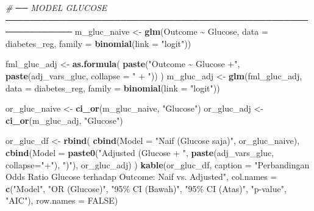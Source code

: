 \documentclass[
  11pt,
]{article}
\newenvironment{Shaded}{\begin{snugshade}}{\end{snugshade}}
\newcommand{\AttributeTok}[1]{\textcolor[rgb]{0.13,0.29,0.53}{#1}}
\newcommand{\CommentTok}[1]{\textcolor[rgb]{0.56,0.35,0.01}{\textit{#1}}}
\newcommand{\ConstantTok}[1]{\textcolor[rgb]{0.56,0.35,0.01}{#1}}
\newcommand{\FunctionTok}[1]{\textcolor[rgb]{0.13,0.29,0.53}{\textbf{#1}}}
\newcommand{\NormalTok}[1]{#1}
\newcommand{\OtherTok}[1]{\textcolor[rgb]{0.56,0.35,0.01}{#1}}
\newcommand{\SpecialCharTok}[1]{\textcolor[rgb]{0.81,0.36,0.00}{\textbf{#1}}}
\newcommand{\StringTok}[1]{\textcolor[rgb]{0.31,0.60,0.02}{#1}}
\begin{document}
\begin{Shaded}
\begin{Highlighting}[]
\CommentTok{\# ── MODEL GLUCOSE ─────────────────────────────────────────────────────────────}
\NormalTok{m\_gluc\_naive }\OtherTok{\textless{}{-}} \FunctionTok{glm}\NormalTok{(Outcome }\SpecialCharTok{\textasciitilde{}}\NormalTok{ Glucose,}
                     \AttributeTok{data   =}\NormalTok{ diabetes\_reg,}
                     \AttributeTok{family =} \FunctionTok{binomial}\NormalTok{(}\AttributeTok{link =} \StringTok{"logit"}\NormalTok{))}

\NormalTok{fml\_gluc\_adj }\OtherTok{\textless{}{-}} \FunctionTok{as.formula}\NormalTok{(}
  \FunctionTok{paste}\NormalTok{(}\StringTok{"Outcome \textasciitilde{} Glucose +"}\NormalTok{, }\FunctionTok{paste}\NormalTok{(adj\_vars\_gluc, }\AttributeTok{collapse =} \StringTok{" + "}\NormalTok{))}
\NormalTok{)}
\NormalTok{m\_gluc\_adj }\OtherTok{\textless{}{-}} \FunctionTok{glm}\NormalTok{(fml\_gluc\_adj,}
                   \AttributeTok{data   =}\NormalTok{ diabetes\_reg,}
                   \AttributeTok{family =} \FunctionTok{binomial}\NormalTok{(}\AttributeTok{link =} \StringTok{"logit"}\NormalTok{))}

\NormalTok{or\_gluc\_naive }\OtherTok{\textless{}{-}} \FunctionTok{ci\_or}\NormalTok{(m\_gluc\_naive, }\StringTok{"Glucose"}\NormalTok{)}
\NormalTok{or\_gluc\_adj   }\OtherTok{\textless{}{-}} \FunctionTok{ci\_or}\NormalTok{(m\_gluc\_adj,   }\StringTok{"Glucose"}\NormalTok{)}

\NormalTok{or\_gluc\_df }\OtherTok{\textless{}{-}} \FunctionTok{rbind}\NormalTok{(}
  \FunctionTok{cbind}\NormalTok{(}\AttributeTok{Model =} \StringTok{"Naif (Glucose saja)"}\NormalTok{,         or\_gluc\_naive),}
  \FunctionTok{cbind}\NormalTok{(}\AttributeTok{Model =} \FunctionTok{paste0}\NormalTok{(}\StringTok{"Adjusted (Glucose + "}\NormalTok{,}
                        \FunctionTok{paste}\NormalTok{(adj\_vars\_gluc, }\AttributeTok{collapse=}\StringTok{"+"}\NormalTok{), }\StringTok{")"}\NormalTok{), or\_gluc\_adj)}
\NormalTok{)}
\FunctionTok{kable}\NormalTok{(or\_gluc\_df,}
      \AttributeTok{caption =} \StringTok{"Perbandingan Odds Ratio Glucose terhadap Outcome: Naif vs. Adjusted"}\NormalTok{,}
      \AttributeTok{col.names =} \FunctionTok{c}\NormalTok{(}\StringTok{"Model"}\NormalTok{, }\StringTok{"OR (Glucose)"}\NormalTok{, }\StringTok{"95\% CI (Bawah)"}\NormalTok{, }\StringTok{"95\% CI (Atas)"}\NormalTok{,}
                    \StringTok{"p{-}value"}\NormalTok{, }\StringTok{"AIC"}\NormalTok{),}
      \AttributeTok{row.names =} \ConstantTok{FALSE}\NormalTok{)}
\end{Highlighting}
\end{Shaded}
\end{document}
